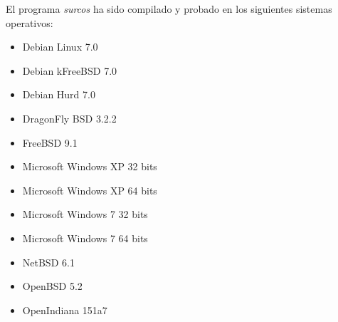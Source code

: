 El programa \emph{surcos} ha sido compilado y probado en los siguientes sistemas
operativos:
\begin{itemize}
\item Debian Linux 7.0
\item Debian kFreeBSD 7.0
\item Debian Hurd 7.0
\item DragonFly BSD 3.2.2
\item FreeBSD 9.1
\item Microsoft Windows XP 32 bits
\item Microsoft Windows XP 64 bits
\item Microsoft Windows 7 32 bits
\item Microsoft Windows 7 64 bits
\item NetBSD 6.1
\item OpenBSD 5.2
\item OpenIndiana 151a7
\end{itemize}
